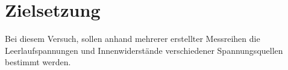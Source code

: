 \section{Zielsetzung}
\label{sec:Zielsetzung}

Bei diesem Versuch, sollen anhand mehrerer erstellter Messreihen die Leerlaufspannungen und Innenwiderstände verschiedener Spannungsquellen bestimmt werden.
